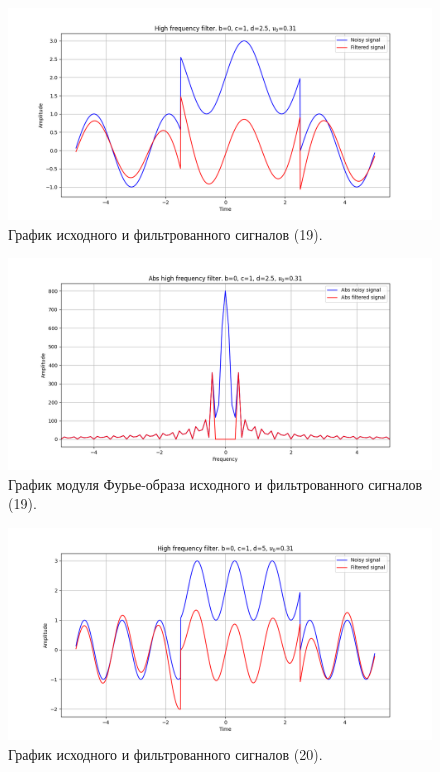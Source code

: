 \documentclass[a4paper, 12pt]{article}
\begin{document}
    \begin{figure}[!htb]
        \centering
        \includegraphics[scale=0.48]{19_u_flt_u_nolow.png}
        \captionsetup{skip=0pt}
        \caption{График исходного и фильтрованного сигналов (19).}
        \label{fig:fig63}
    \end{figure}
    \begin{figure}[!htb]
        \centering
        \includegraphics[scale=0.48]{19_abs_u_U_nolow.png}
        \captionsetup{skip=0pt}
        \caption{График модуля Фурье-образа исходного и фильтрованного сигналов (19).}
        \label{fig:fig64}
    \end{figure}
    \newpage
    \begin{figure}[!htb]
        \centering
        \includegraphics[scale=0.48]{20_u_flt_u_nolow.png}
        \captionsetup{skip=0pt}
        \caption{График исходного и фильтрованного сигналов (20).}
        \label{fig:fig65}
    \end{figure}
\end{document}
